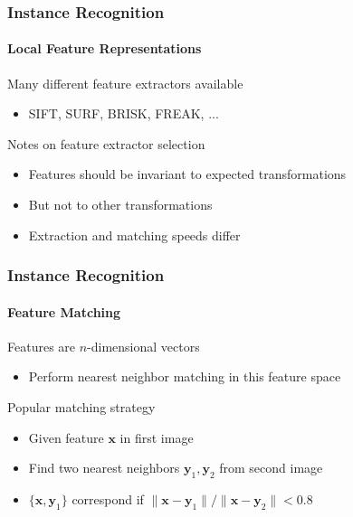 \documentclass[xetex,professionalfont]{beamer}
\renewcommand{\vec}[1]{\ensuremath{\mathbf{#1}}}
\newcommand{\vx}{\vec{x}}
\newcommand{\vy}{\vec{y}}
\begin{document}
\begin{frame}
\frametitle{Instance Recognition}
\framesubtitle{Local Feature Representations}

Many different feature extractors available
\begin{itemize}
    \item SIFT, SURF, BRISK, FREAK, ... %
\end{itemize}

\bigskip
Notes on feature extractor selection
\begin{itemize}
    \item Features should be invariant to expected transformations %
    \item But not to other transformations %
    \item Extraction and matching speeds differ %
\end{itemize}

\end{frame}


\begin{frame}
\frametitle{Instance Recognition}
\framesubtitle{Feature Matching}

Features are $n$-dimensional vectors
\begin{itemize}
    \item Perform nearest neighbor matching in this feature space
\end{itemize}

\bigskip
Popular matching strategy
\begin{itemize}
    \item Given feature $\vx$ in first image
    \item Find two nearest neighbors $\vy_1,\vy_2$ from second image
    \item $\{\vx,\vy_1\}$ correspond if $\lVert\vx-\vy_1\rVert/\lVert\vx-\vy_2\rVert<0.8$ %
\end{itemize}

\end{frame}
\end{document}
